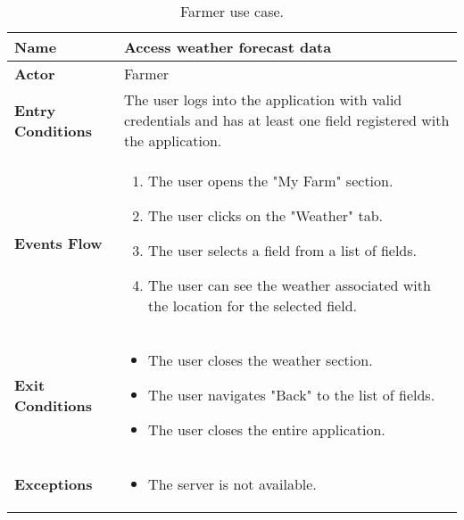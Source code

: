 \begin{table}[hbt!]
\centering
\caption{\label{tab:addOne{table_counter}}Farmer use case.}
\renewcommand{\arraystretch}{1.25}
\begin{tabular}{|l|>{\raggedright\arraybackslash}m{12cm}|}
    \hline
    \textbf{Name} & Access weather forecast data\\
    \hline
   	\textbf{Actor} & Farmer\\
    \hline
    \textbf{Entry Conditions} & The user logs into the application with valid credentials and has at least one field registered with the application.\\
    \hline
    
    \textbf{Events Flow} & \begin{enumerate}
    			\item The user opens the "My Farm" section.
    			\item The user clicks on the "Weather" tab.
    			\item The user selects a field from a list of fields.
    			\item The user can see the weather associated with the location for the selected field.
	    		\end{enumerate}
    	\\
    \hline
    \textbf{Exit Conditions} & \begin{itemize}
    	\item The user closes the weather section.
    	\item The user navigates "Back" to the list of fields.
   		\item The user closes the entire application.
   		\end{itemize} \\
    \hline
    \textbf{Exceptions} &
    		\begin{itemize}
    			\item The server is not available.
    		\end{itemize}
    \\
    \hline
\end{tabular}
\end{table}